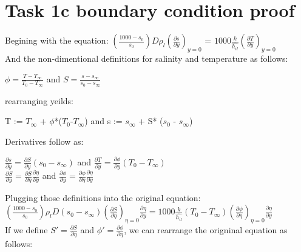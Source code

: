 \documentclass[letterpaper, 10pt]{article}
\begin{document}
\section*{Task 1c boundary condition proof} %
\label{sec:Task 1c}
Begining with the equation: $\left( \frac{1000-s_0}{s_0} \right) D \rho_l \left( \frac{\partial s}{\partial y} \right)_{y = 0}$ = $1000 \frac{k}{\hat{h_{il}}}  \left (\frac{\partial T}{\partial y} \right)_{y = 0}$\\

\noindent And the non-dimentional definitions for salinity and temperature as follows:\\
\begin{center}
	$\phi = \frac{T-T_\infty}{T_0-T_\infty}$ and $S = \frac{s - s_\infty}{s_0 - s_\infty}$
\end{center}

\noindent rearranging yeilds:\\
\begin{center}
	T := $T_\infty$ + $\phi$*($T_0$-$T_\infty$) and s := $s_\infty $ + S* ($s_0$ - $s_\infty $)
\end{center}

\noindent Derivatives follow as:\\
\begin{center}
	$\frac{\partial s}{\partial y} = \frac{\partial S}{\partial y}(s_0 - s_\infty)$ and 	$\frac{\partial T}{\partial y} = \frac{\partial \phi}{\partial y}(T_0 - T_\infty)$\\
	
	$\frac{\partial S}{\partial y} =  \frac{\partial S}{\partial \eta}  \frac{\partial \eta}{\partial y}$ and $\frac{\partial \phi}{\partial y} =  \frac{\partial \phi}{\partial \eta}  \frac{\partial \eta}{\partial y}$\\
\end{center}

\noindent Plugging those definitions into the original equation:\\
$\left(\frac{1000 - s_0}{s_0}\right) \rho_l D (s_0 - s_\infty) \left(\frac{\partial S}{\partial \eta}\right)_{\eta = 0} \frac{\partial \eta}{\partial y} = 1000 \frac{k}{\hat{h_{il}}} (T_0 - T_\infty) \left(\frac{\partial \phi}{\partial \eta}\right)_{\eta = 0}\frac{\partial \eta}{\partial y}$\\

\noindent If we define $S' = \frac{\partial S}{\partial \eta} $ and $ \phi ' = \frac{\partial \phi}{\partial \eta}$, we can rearrange the origninal equation as follows:\\
\end{document}
